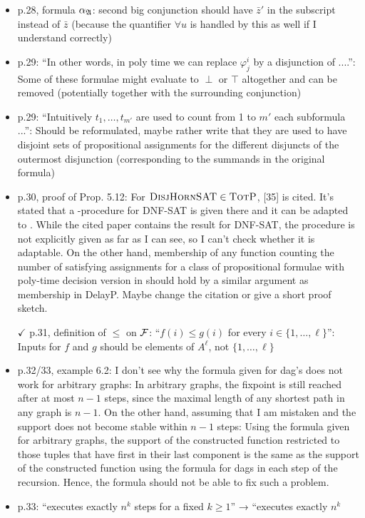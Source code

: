 \begin{itemize}
\item p.28, formula $\alpha_{\mathfrak{A}}$: second big conjunction should have $\bar{z}'$ in the subscript instead of $\bar{z}$ (because
the quantifier $\forall u$ is handled by this as well if I understand correctly)
\item p.29: ``In other words, in poly time we can replace $\varphi_j^i$ by a disjunction of ....'': Some of these
formulae might evaluate to $\perp$ or $\top$ altogether and can be removed (potentially together with
the surrounding conjunction)
\item p.29: ``Intuitively $t_1,\ldots,t_{m'}$ are used to count from 1 to $m'$ each subformula ...'': Should be
reformulated, maybe rather write that they are used to have disjoint sets of propositional
assignments for the different disjuncts of the outermost disjunction (corresponding to the
summands in the original formula)
\item p.30, proof of Prop. 5.12: For $\textsc{DisjHornSAT} \in \text{\sc TotP}$, [35] is cited. It’s stated that a \totp-procedure
for DNF-SAT is given there and it can be adapted to \dhsat. While the
cited paper contains the result for DNF-SAT, the procedure is not explicitly given as far as
I can see, so I can't check whether it is adaptable. On the other hand, membership of any
function counting the number of satisfying assignments for a class of propositional formulae
with poly-time decision version in \totp should hold by a similar argument as membership in
DelayP. Maybe change the citation or give a short proof sketch.
\item[$\checkmark$] p.31, definition of $\leq$ on $\mathcal{F}$: ``$f(i) \leq g(i)$ for every $i \in \{1,\ldots,\ell\}$'': Inputs for $f$ and $g$ should be
elements of $A^{\ell}$, not $\{1,\ldots,\ell\}$
\item p.32/33, example 6.2: I don't see why the formula given for dag's does not work for arbitrary
graphs: In arbitrary graphs, the fixpoint is still reached after at most $n-1$ steps, since the
maximal length of any shortest path in any graph is $n-1$. On the other hand, assuming that
I am mistaken and the support does not become stable within $n-1$ steps: Using the formula
given for arbitrary graphs, the support of the constructed function restricted to those tuples
that have first in their last component is the same as the support of the constructed function
using the formula for dags in each step of the recursion. Hence, the formula should not be
able to fix such a problem.
\item p.33: ``executes exactly $n^k$ steps for a fixed $k \geq 1$'' → ``executes exactly $n^k$

\end{itemize}
